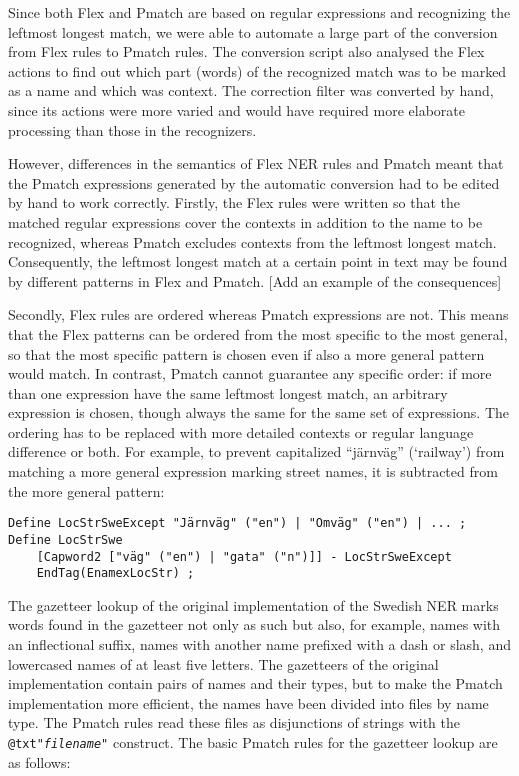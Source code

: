 \documentclass{llncs}
\begin{document}
Since both Flex and Pmatch are based on regular expressions and
recognizing the leftmost longest match, we were able to automate a
large part of the conversion from Flex rules to Pmatch rules. The
conversion script also analysed the Flex actions to find out which
part (words) of the recognized match was to be marked as a name and
which was context. The correction filter was converted by hand, since
its actions were more varied and would have required more elaborate
processing than those in the recognizers.

However, differences in the semantics of Flex NER rules and Pmatch
meant that the Pmatch expressions generated by the automatic
conversion had to be edited by hand to work correctly. Firstly, the
Flex rules were written so that the matched regular expressions cover
the contexts in addition to the name to be recognized, whereas Pmatch
excludes contexts from the leftmost longest match. Consequently, the
leftmost longest match at a certain point in text may be found by
different patterns in Flex and Pmatch. \textsf{[Add an example of the
  consequences]}

Secondly, Flex rules are ordered whereas Pmatch expressions are not.
This means that the Flex patterns can be ordered from the most
specific to the most general, so that the most specific pattern is
chosen even if also a more general pattern would match. In contrast,
Pmatch cannot guarantee any specific order: if more than one
expression have the same leftmost longest match, an arbitrary
expression is chosen, though always the same for the same set of
expressions. The ordering has to be replaced with more detailed
contexts or regular language difference or both. For example, to
prevent capitalized ``järnväg'' (`railway') from matching a more
general expression marking street names, it is subtracted from the
more general pattern:

\begin{verbatim}
Define LocStrSweExcept "Järnväg" ("en") | "Omväg" ("en") | ... ;
Define LocStrSwe
    [Capword2 ["väg" ("en") | "gata" ("n")]] - LocStrSweExcept
    EndTag(EnamexLocStr) ;
\end{verbatim}

The gazetteer lookup of the original implementation of the Swedish NER
marks words found in the gazetteer not only as such but also, for
example, names with an inflectional suffix, names with another name
prefixed with a dash or slash, and lowercased names of at least five
letters. The gazetteers of the original implementation contain pairs
of names and their types, but to make the Pmatch implementation more
efficient, the names have been divided into files by name type. The
Pmatch rules read these files as disjunctions of strings with the
\texttt{@txt"\textit{filename}"} construct. The basic Pmatch rules for
the gazetteer lookup are as follows:
\end{document}
